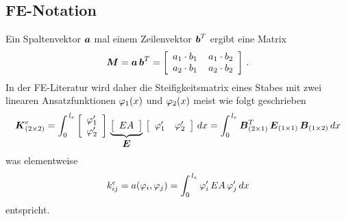 \textcolor{sectionTitleBlue}{\section{FE-Notation}}
Ein Spaltenvektor $\vek a$ mal einem Zeilenvektor $\vek b^T$ ergibt eine Matrix
\begin{align}
\vek M = \vek a\,\vek b^T = \left [ \barr{c @{\hspace{4mm}} c} a_1 \cdot b_1 & a_1 \cdot b_2 \\
a_2 \cdot b_1 & a_2 \cdot b_2\earr \right]\,.
\end{align}
In der FE-Literatur wird daher die Steifigkeitsmatrix eines Stabes mit zwei linearen Ansatzfunktionen $\Np_1(x)$ und $\Np_2(x)$ meist wie folgt geschrieben
\begin{align}
\vek K^e_{(2 \times 2)} = \int_0^{\,l_e} \left [ \barr{l} \Np_1' \\ \Np_2' \earr \right] \,\underbrace{\left [ \barr{c} EA  \earr \right]}_{\vek E}\,\left [ \barr{c c} \Np_1' & \Np_2' \earr \right]\vphantom{]}\,dx= \int_0^{\,l_e} \vek B^T_{(2 \times 1)}\,\vek E_{(1 \times 1)}\, \vek B_{(1 \times 2)}\,dx
\end{align}
was elementweise
\begin{align}
k_{ij}^e = a(\Np_i,\Np_j) = \int_0^{\,l_e} \Np_i'\,EA\,\Np_j'\,dx
\end{align}
entspricht.


